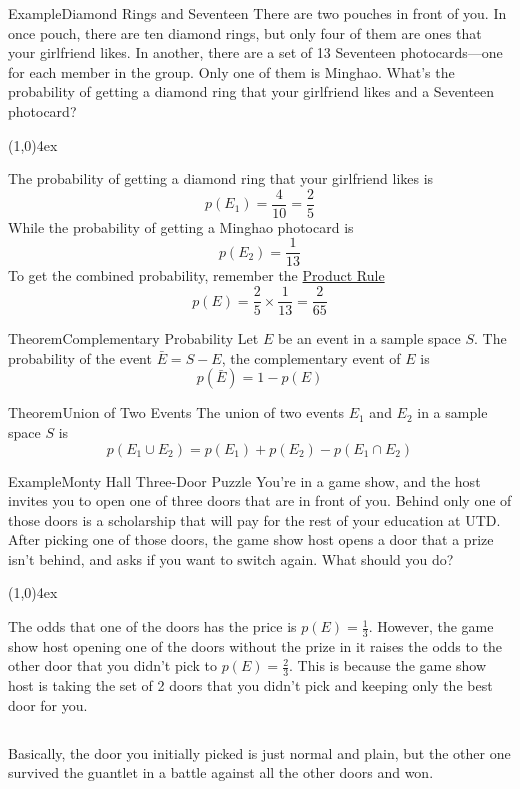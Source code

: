 \documentclass{MathNotes}
\newenvironment{example}[1]{\begin{BlueBox}{Example}{#1}}{\end{BlueBox}}
\newenvironment{theorem}[1]{\begin{GrayBox}{Theorem}{#1}}{\end{GrayBox}}
\newcommand{\br}{
	\begin{center}
		\line(1,0){4ex}
	\end{center}
}
\newcommand{\bl}{
	\newline$ $\newline
}
\begin{document}
\begin{example}{Diamond Rings and Seventeen}\label{ex:finite-probability}
	There are two pouches in front of you. In once pouch, there are ten
	diamond rings, but only four of them are ones that your girlfriend likes.
	In another, there are a set of 13 Seventeen photocards---one for each member
	in the group. Only one of them is Minghao. What's the probability of getting
	a diamond ring that your girlfriend likes and a Seventeen photocard?
	\br
	The probability of getting a diamond ring that your girlfriend likes is
	\[p(E_1)=\frac{4}{10}=\frac{2}{5}\]
	While the probability of getting a Minghao photocard is
	\[p(E_2)=\frac{1}{13}\]
	To get the combined probability, remember the
	\hyperref[th:product-rule]{Product Rule}
	\[p(E)=\frac{2}{5}\times\frac{1}{13}=\frac{2}{65}\]
\end{example}

\begin{theorem}{Complementary Probability}\label{th:complementary-probability}
	Let $E$ be an event in a sample space $S$. The probability of the event
	$\bar E=S-E$, the complementary event of $E$ is \[p(\bar E)=1-p(E)\]
\end{theorem}

\begin{theorem}{Union of Two Events}\label{th:union-of-events}
	The union of two events $E_1$ and $E_2$ in a sample space $S$ is
	\[p(E_1\cup E_2)=p(E_1)+p(E_2)-p(E_1\cap E_2)\]
\end{theorem}

\begin{example}{Monty Hall Three-Door Puzzle}\label{ex:three-door-puzzle}
	You're in a game show, and the host invites you to open one of three doors
	that are in front of you. Behind only one of those doors is a scholarship
	that will pay for the rest of your education at UTD. After picking one
	of those doors, the game show host opens a door that a prize isn't behind,
	and asks if you want to switch again. What should you do?
	\br
	The odds that one of the doors has the price is $p(E)=\frac{1}{3}$.
	However, the game show host opening one of the doors without the prize
	in it raises the odds to the other door that you didn't pick to $p(E)=\frac{2}{3}$. This is because the game show host is taking the set of 2 doors that
	you didn't pick and keeping only the best door for you.
	\bl
	Basically, the door you initially picked is just normal and plain, but the
	other one survived the guantlet in a battle against all the other doors and
	won.
\end{example}
\end{document}
